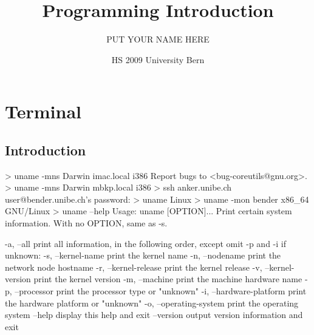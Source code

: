 \documentclass[10pt,a4paper]{scrartcl}
\date{HS 2009 University Bern}
\author{PUT YOUR NAME HERE}
\title{Programming Introduction}
\begin{document}
\section{Terminal}
\subsection{Introduction}
\begin{terminalcode}
> uname -mns
  Darwin imac.local i386
  Report bugs to <bug-coreutils@gnu.org>.
> uname -mns
  Darwin mbkp.local i386
> ssh anker.unibe.ch
  user@bender.unibe.ch's password: 
> uname
  Linux
> uname -mon
  bender x86_64 GNU/Linux
> uname --help
  Usage: uname [OPTION]...
  Print certain system information.  With no OPTION, same as -s.
  
    -a, --all                print all information, in the following order,
                               except omit -p and -i if unknown:
    -s, --kernel-name        print the kernel name
    -n, --nodename           print the network node hostname
    -r, --kernel-release     print the kernel release
    -v, --kernel-version     print the kernel version
    -m, --machine            print the machine hardware name
    -p, --processor          print the processor type or "unknown"
    -i, --hardware-platform  print the hardware platform or "unknown"
    -o, --operating-system   print the operating system
        --help     display this help and exit
        --version  output version information and exit
\end{terminalcode}

\end{document}
